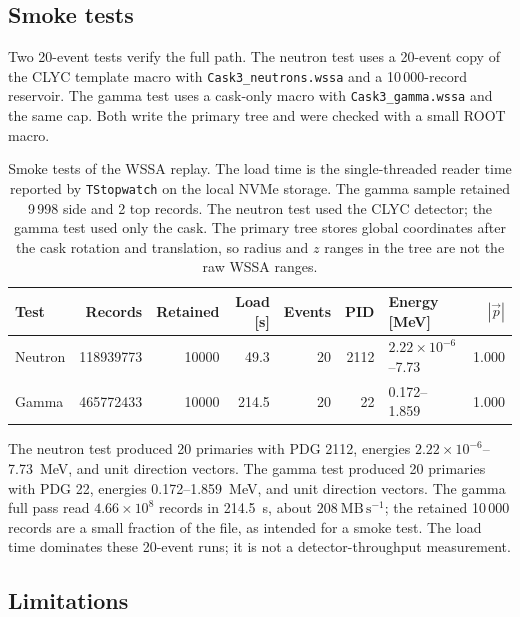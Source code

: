 \documentclass[11pt,a4paper]{article}
\begin{document}
\subsection{Smoke tests}

Two 20-event tests verify the full path.  The neutron test uses a 20-event copy
of the CLYC template macro with \texttt{Cask3\_neutrons.wssa} and a
10\,000-record reservoir.  The gamma test uses a cask-only macro with
\texttt{Cask3\_gamma.wssa} and the same cap.  Both write the primary tree and
were checked with a small ROOT macro.

\begin{table}[t]
\centering
\caption{Smoke tests of the WSSA replay.  The load time is the single-threaded
reader time reported by \texttt{TStopwatch} on the local NVMe storage.  The
gamma sample retained 9\,998 side and 2 top records.  The neutron test used the
CLYC detector; the gamma test used only the cask.  The primary tree stores
global coordinates after the cask rotation and translation, so radius and $z$
ranges in the tree are not the raw WSSA ranges.}
\label{tab:tests}
\footnotesize
\begin{tabular}{@{}l r r r r r l r@{}}
\toprule
Test & Records & Retained & Load [s] & Events & PID & Energy [MeV] & $|\vec p|$ \\
\midrule
Neutron & \num{118939773} & \num{10000} & 49.3 & 20 & 2112
        & $2.22\times10^{-6}$--7.73 & 1.000 \\
Gamma   & \num{465772433} & \num{10000} & 214.5 & 20 & 22
        & 0.172--1.859 & 1.000 \\
\bottomrule
\end{tabular}
\end{table}

The neutron test produced 20 primaries with PDG 2112, energies
$2.22\times10^{-6}$--7.73~MeV, and unit direction vectors.  The gamma test
produced 20 primaries with PDG 22, energies 0.172--1.859~MeV, and unit
direction vectors.  The gamma full pass read $4.66\times10^{8}$ records in
214.5~s, about $208~\mathrm{MB\,s^{-1}}$; the retained 10\,000 records are a
small fraction of the file, as intended for a smoke test.  The load time
dominates these 20-event runs; it is not a detector-throughput measurement.

\subsection{Limitations}
\end{document}
